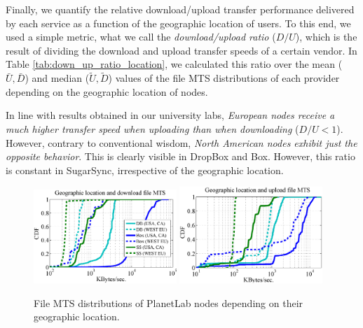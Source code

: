 Finally, we quantify the relative download/upload transfer performance delivered by 
each service as a function of the geographic location of users.
To this end,
we used a simple metric, what we call the \textit{download/upload ratio} ($D/U$), which
is the result of dividing the download and upload transfer speeds of a certain vendor.   
In Table \ref{tab:down_up_ratio_location}, we calculated this ratio over the mean ($\bar{U},\bar{D}$) 
and median ($\tilde{U},\tilde{D}$) values of the file MTS distributions of each
provider depending on the geographic location of nodes. 

In line with results obtained in our university labs, 
\textit{European nodes receive a much higher 
transfer speed when uploading than when downloading} ($D/U<1$). 
However, contrary to conventional wisdom, \textit{North American nodes exhibit 
just the opposite behavior}. This is clearly visible in DropBox and Box. However, this ratio is constant
in SugarSync, irrespective of the geographic location.



\begin{figure}[h]
\centering	
{\label{fig:transfer_times_geographic_location_downloads}
\includegraphics[width=0.48\textwidth]{figures/geographic_location_downloads.eps}} 
{\label{fig:transfer_times_geographic_location_uploads}
\includegraphics[width=0.48\textwidth]{figures/geographic_location_uploads.eps}}
	\caption{File MTS distributions of PlanetLab nodes depending on their geographic location.}
	\label{fig:transfer_times_geographic_location}
\end{figure}


